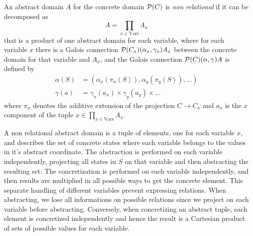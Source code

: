 \begin{definition}
	An abstract domain $A$ for the concrete domain $\mathcal{P}(C)$ is \textit{non relational} if it can be decomposed as
	\[
	A = \prod\limits_{x \in \text{Vars}} A_x
	\]
	that is a product of one abstract domain for each variable, where for each variable $x$ there is a Galois connection $\mathcal{P}(C_x) (\alpha_x, \gamma_x) A_x$ between the concrete domain for that variable and $A_x$, and the Galois connection $\mathcal{P}(C) (\alpha, \gamma) A$ is defined by
	\begin{align*}
		\alpha(S) &= (\alpha_x(\pi_x(S)), \alpha_y(\pi_y(S)), \dots) \\
		\gamma(a) &= \gamma_x(a_x) \times \gamma_y(a_y) \times \dots
	\end{align*}
	where $\pi_x$ denotes the additive extension of the projection $C \rightarrow C_x$ and $a_x$ is the $x$ component of the tuple $x \in \prod\limits_{x \in \text{Vars}} A_x$.
\end{definition}

A non relational abstract domain is a tuple of elements, one for each variable $x$, and describes the set of concrete states where each variable belongs to the values in it's abstract coordinate. The abstraction is performed on each variable independently, projecting all states in $S$ on that variable and then abstracting the resulting set. The concretization is performed on each variable independently, and then results are multiplied in all possible ways to get the concrete element.
This separate handling of different variables prevent expressing relations. When abstracting, we lose all informations on possible relations since we project on each variable before abstracting. Conversely, when concretizing an abstract tuple, each element is concretized independently and hence the result is a Cartesian product of sets of possible values for each variable.


